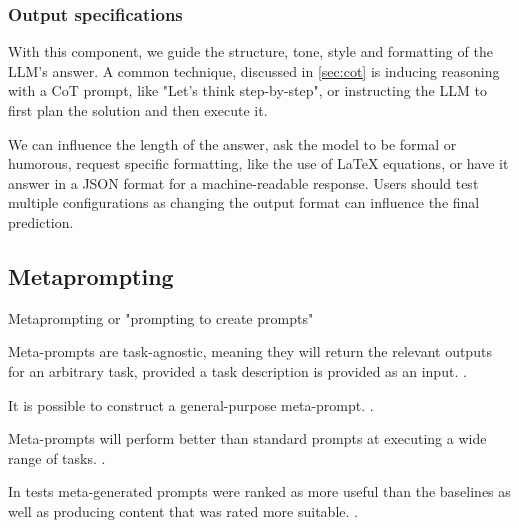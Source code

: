 \subsubsection{Output specifications}
With this component, we guide the structure, tone, style and formatting of the LLM's answer. 
A common technique, discussed in \ref{sec:cot} is inducing reasoning
with a CoT prompt, like "Let's think step-by-step", or instructing the LLM to 
first plan the solution and then execute it. 

We can influence the length of the answer, ask the model to be formal or humorous,
request specific formatting, like the use of \LaTeX{} equations, or have it answer in a JSON format
for a machine-readable response. Users should test multiple configurations as changing the output format
can influence the final prediction\cite{salinas2024butterflyeffectalteringprompts}.

\subsection{Metaprompting}
Metaprompting or "prompting to create prompts"

Meta-prompts are task-agnostic, meaning they will return the relevant outputs for an arbitrary task, provided a task description is provided as an input.  \cite{dewynter2024metaprompting}.

It is possible to construct a general-purpose meta-prompt. \cite{dewynter2024metaprompting}.

Meta-prompts will perform better than standard prompts at executing a wide range of tasks.  \cite{dewynter2024metaprompting}.

In tests meta-generated prompts were ranked as more useful than the baselines as well as producing content that was rated more suitable.  \cite{dewynter2024metaprompting}.
